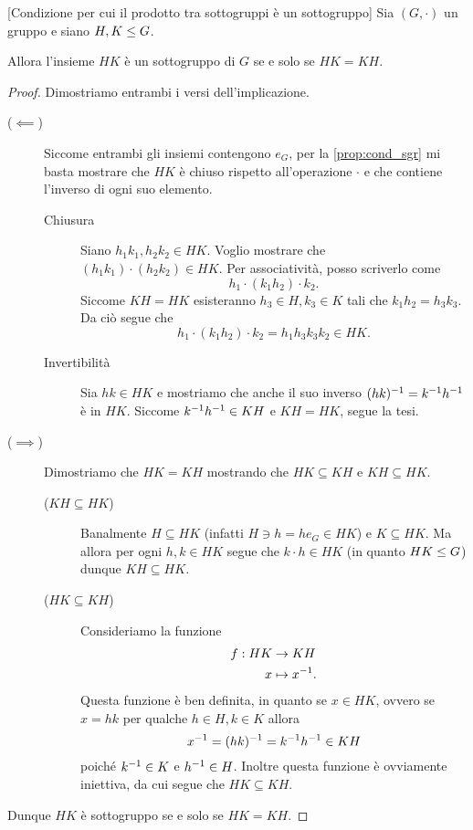 \begin{proposition}\label{prop:cond_prod_sgr_e'_sgr}
    [Condizione per cui il prodotto tra sottogruppi è un sottogruppo] Sia $(G, \cdot)$ un gruppo e siano $H,K \leq G$.

    Allora l'insieme $HK$ è un sottogruppo di $G$ se e solo se $HK = KH$.
\end{proposition}
\begin{proof}
    Dimostriamo entrambi i versi dell'implicazione.
    \begin{description}
        \item[($\impliedby$)] Siccome entrambi gli insiemi contengono $e_G$, per la \autoref{prop:cond_sgr} mi basta mostrare che $HK$ è chiuso rispetto all'operazione $\cdot$ e che contiene l'inverso di ogni suo elemento. 
        \begin{description}
            \item[Chiusura] Siano $h_1k_1, h_2k_2 \in HK$. Voglio mostrare che $(h_1k_1) \cdot (h_2k_2) \in HK$. Per associatività, posso scriverlo come \[
                h_1 \cdot (k_1h_2) \cdot k_2.    
            \] Siccome $KH = HK$ esisteranno $h_3 \in H, k_3 \in K$ tali che $k_1h_2 = h_3k_3$. Da ciò segue che \[
                h_1 \cdot (k_1h_2) \cdot k_2 = h_1h_3k_3k_2 \in HK.
            \]
            \item[Invertibilità] Sia $hk \in HK$ e mostriamo che anche il suo inverso $(hk)^{-1} = k^{-1} h^{-1}$ è in $HK$. Siccome $k^{-1} h^{-1} \in KH$ e $KH = HK$, segue la tesi.
        \end{description}
        \item[($\implies$)] Dimostriamo che $HK = KH$ mostrando che $HK \subseteq KH$ e $KH \subseteq HK$.
        \begin{description}
            \item[($KH \subseteq HK$)] Banalmente $H \subseteq HK$ (infatti $H \ni h = he_G \in HK$) e $K \subseteq HK$. Ma allora per ogni $h, k \in HK$ segue che $k \cdot h \in HK$ (in quanto $HK \leq G$) dunque $KH \subseteq HK$.
            \item[($HK \subseteq KH$)] Consideriamo la funzione \begin{align*}
                f : HK &\to KH\\
                x &\mapsto x^{-1}.
            \end{align*} Questa funzione è ben definita, in quanto se $x \in HK$, ovvero se $x = hk$ per qualche $h \in H, k \in K$ allora \[
                x^{-1} = (hk)^{-1} = k^{-1} h^{-1} \in KH    
            \] poiché $k^{-1} \in K$ e $h^{-1} \in H$. Inoltre questa funzione è ovviamente iniettiva, da cui segue che $HK \subseteq KH$.
        \end{description}
    \end{description}
    Dunque $HK$ è sottogruppo se e solo se $HK = KH$.
\end{proof}